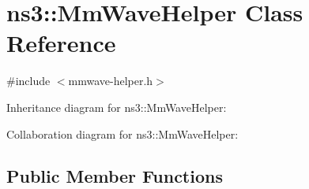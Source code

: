 \hypertarget{classns3_1_1MmWaveHelper}{}\section{ns3\+:\+:Mm\+Wave\+Helper Class Reference}
\label{classns3_1_1MmWaveHelper}


{\ttfamily \#include $<$mmwave-\/helper.\+h$>$}



Inheritance diagram for ns3\+:\+:Mm\+Wave\+Helper\+:


Collaboration diagram for ns3\+:\+:Mm\+Wave\+Helper\+:
\subsection*{Public Member Functions}
